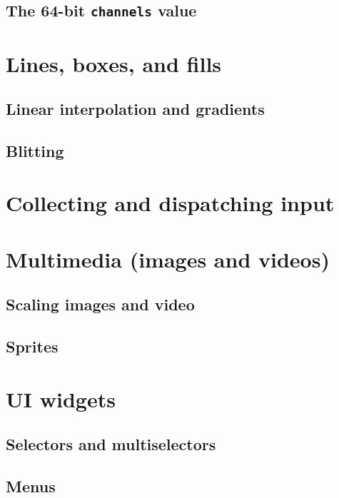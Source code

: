 \documentclass[letterpaper,10pt]{article}
\begin{document}
\subsection{The 64-bit \texttt{channels} value}

\section{Lines, boxes, and fills}
\subsection{Linear interpolation and gradients}
\subsection{Blitting}

\section{Collecting and dispatching input}

\section{Multimedia (images and videos)}
\subsection{Scaling images and video}
\subsection{Sprites}

\section{UI widgets}
\label{section:uiwidgets}
\subsection{Selectors and multiselectors}
\subsection{Menus}
\end{document}
